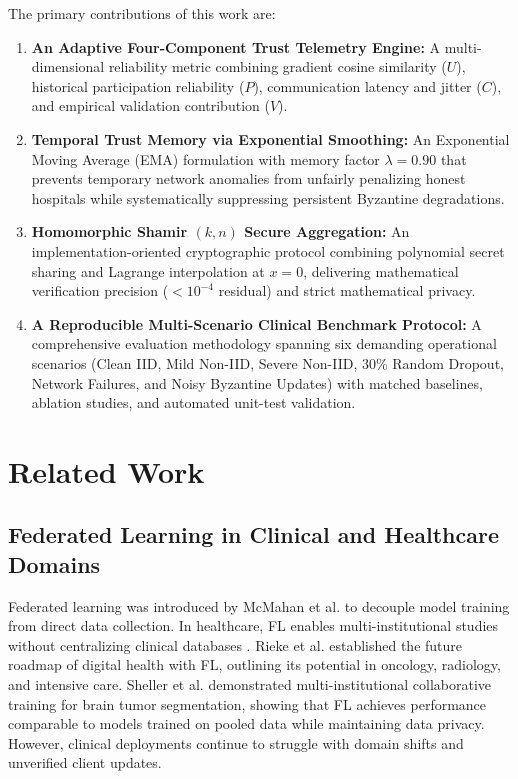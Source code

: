 \documentclass[conference]{IEEEtran}
\begin{document}
The primary contributions of this work are:
\begin{enumerate}
    \item \textbf{An Adaptive Four-Component Trust Telemetry Engine:} A multi-dimensional reliability metric combining gradient cosine similarity ($U$), historical participation reliability ($P$), communication latency and jitter ($C$), and empirical validation contribution ($V$).
    \item \textbf{Temporal Trust Memory via Exponential Smoothing:} An Exponential Moving Average (EMA) formulation with memory factor $\lambda = 0.90$ that prevents temporary network anomalies from unfairly penalizing honest hospitals while systematically suppressing persistent Byzantine degradations.
    \item \textbf{Homomorphic Shamir $(k, n)$ Secure Aggregation:} An implementation-oriented cryptographic protocol combining polynomial secret sharing and Lagrange interpolation at $x=0$, delivering mathematical verification precision ($< 10^{-4}$ residual) and strict mathematical privacy.
    \item \textbf{A Reproducible Multi-Scenario Clinical Benchmark Protocol:} A comprehensive evaluation methodology spanning six demanding operational scenarios (Clean IID, Mild Non-IID, Severe Non-IID, 30\% Random Dropout, Network Failures, and Noisy Byzantine Updates) with matched baselines, ablation studies, and automated unit-test validation.
\end{enumerate}

\section{Related Work}

\subsection{Federated Learning in Clinical and Healthcare Domains}
Federated learning was introduced by McMahan et al. \cite{mcmahan2017communication} to decouple model training from direct data collection. In healthcare, FL enables multi-institutional studies without centralizing clinical databases \cite{kairouz2021advances, yang2019federated, rieke2020future, sheller2020federated}. Rieke et al. \cite{rieke2020future} established the future roadmap of digital health with FL, outlining its potential in oncology, radiology, and intensive care. Sheller et al. \cite{sheller2020federated} demonstrated multi-institutional collaborative training for brain tumor segmentation, showing that FL achieves performance comparable to models trained on pooled data while maintaining data privacy. However, clinical deployments continue to struggle with domain shifts and unverified client updates.
\end{document}
